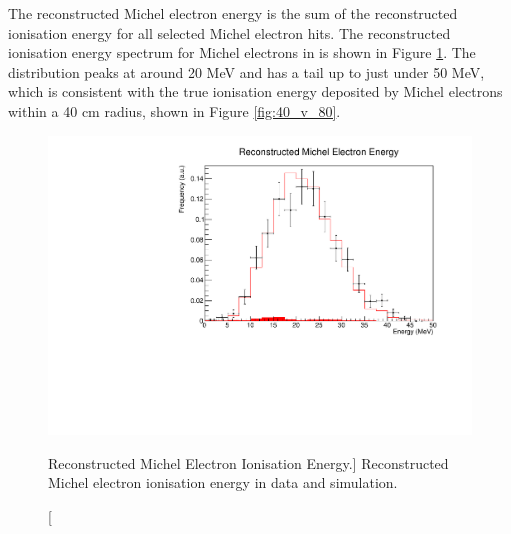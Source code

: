 The reconstructed Michel electron energy is the sum of the reconstructed
ionisation energy for all selected Michel electron hits. The reconstructed 
ionisation energy spectrum for Michel electrons in \protodune{} is shown in Figure 
\ref{fig:michel_ion_reco}. The distribution peaks at around 20 MeV and has a 
tail up to just under 50 MeV, which is consistent with the true ionisation
energy deposited by Michel electrons within a 40 cm radius, shown in Figure
\ref{fig:40_v_80}.
\begin{figure}
	\centering
	\includegraphics[width=\textwidth]{figures/michel_ion_reco.pdf}
	\caption
	[Reconstructed Michel Electron Ionisation Energy.]
	{Reconstructed Michel electron ionisation energy in data and simulation.}
	\label{fig:michel_ion_reco}
\end{figure}

